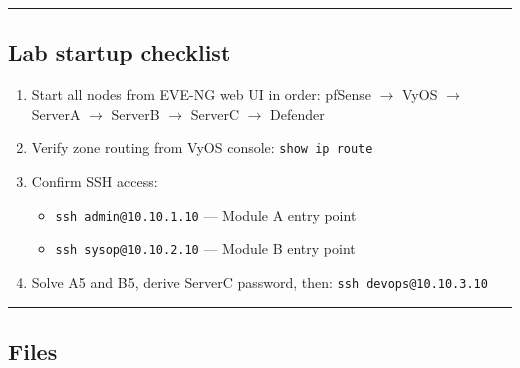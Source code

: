 \begin{center}\rule{0.5\linewidth}{0.5pt}\end{center}

\subsection{Lab startup checklist}

\begin{enumerate}
\def\labelenumi{\arabic{enumi}.}
\tightlist
\item
  Start all nodes from EVE-NG web UI in order: pfSense $\rightarrow$ VyOS $\rightarrow$ ServerA $\rightarrow$ ServerB $\rightarrow$ ServerC $\rightarrow$ Defender
\item
  Verify zone routing from VyOS console: \texttt{show\ ip\ route}
\item
  Confirm SSH access:

  \begin{itemize}
  \tightlist
  \item
    \texttt{ssh\ admin@10.10.1.10} --- Module A entry point
  \item
    \texttt{ssh\ sysop@10.10.2.10} --- Module B entry point
  \end{itemize}
\item
  Solve A5 and B5, derive ServerC password, then: \texttt{ssh\ devops@10.10.3.10}
\end{enumerate}

\begin{center}\rule{0.5\linewidth}{0.5pt}\end{center}

\subsection{Files}

